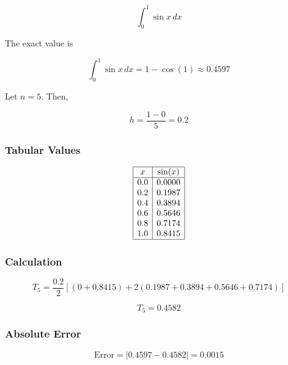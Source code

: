 \documentclass[12pt]{article}
\begin{document}
\[
\int_0^1 \sin x \, dx
\]

The exact value is

\[
\int_0^1 \sin x \, dx = 1 - \cos(1) \approx 0.4597
\]

Let \(n = 5\). Then,

\[
h = \frac{1-0}{5} = 0.2
\]


\subsubsection*{Tabular Values}

\[
\begin{array}{|c|c|}
\hline
x & \sin(x) \\
\hline
0.0 & 0.0000 \\
0.2 & 0.1987 \\
0.4 & 0.3894 \\
0.6 & 0.5646 \\
0.8 & 0.7174 \\
1.0 & 0.8415 \\
\hline
\end{array}
\]


\subsubsection*{Calculation}

\[
T_5 = \frac{0.2}{2}
\left[
(0 + 0.8415) + 2(0.1987 + 0.3894 + 0.5646 + 0.7174)
\right]
\]

\[
T_5 = 0.4582
\]

\subsubsection*{Absolute Error}

\[
\text{Error} = |0.4597 - 0.4582| = 0.0015
\]
\end{document}
